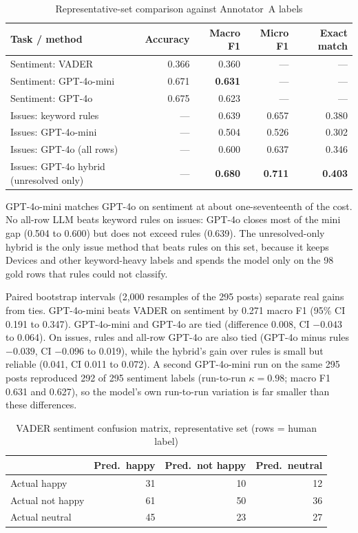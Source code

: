 \documentclass[11pt,a4paper]{article}
\begin{document}
\begin{table}[H]
\centering
\caption{Representative-set comparison against Annotator~A labels}
\label{tab:headlinemetrics}
\begin{tabular}{lrrrr}
\toprule
\textbf{Task / method} & \textbf{Accuracy} & \textbf{Macro F1} & \textbf{Micro F1} & \textbf{Exact match} \\
\midrule
Sentiment: VADER & 0.366 & 0.360 & --- & --- \\
Sentiment: GPT-4o-mini & 0.671 & \textbf{0.631} & --- & --- \\
Sentiment: GPT-4o & 0.675 & 0.623 & --- & --- \\
Issues: keyword rules & --- & 0.639 & 0.657 & 0.380 \\
Issues: GPT-4o-mini & --- & 0.504 & 0.526 & 0.302 \\
Issues: GPT-4o (all rows) & --- & 0.600 & 0.637 & 0.346 \\
Issues: GPT-4o hybrid (unresolved only) & --- & \textbf{0.680} & \textbf{0.711} & \textbf{0.403} \\
\bottomrule
\end{tabular}
\end{table}

GPT-4o-mini matches GPT-4o on sentiment at about one-seventeenth of the cost. No all-row LLM beats keyword rules on issues: GPT-4o closes most of the mini gap (0.504 to 0.600) but does not exceed rules (0.639). The unresolved-only hybrid is the only issue method that beats rules on this set, because it keeps Devices and other keyword-heavy labels and spends the model only on the 98 gold rows that rules could not classify.

Paired bootstrap intervals (2,000 resamples of the 295 posts) separate real gains from ties. GPT-4o-mini beats VADER on sentiment by 0.271 macro F1 (95\% CI 0.191 to 0.347). GPT-4o-mini and GPT-4o are tied (difference 0.008, CI $-0.043$ to 0.064). On issues, rules and all-row GPT-4o are also tied (GPT-4o minus rules $-0.039$, CI $-0.096$ to 0.019), while the hybrid's gain over rules is small but reliable (0.041, CI 0.011 to 0.072). A second GPT-4o-mini run on the same 295 posts reproduced 292 of 295 sentiment labels (run-to-run $\kappa=0.98$; macro F1 0.631 and 0.627), so the model's own run-to-run variation is far smaller than these differences.

\begin{table}[H]
\centering
\caption{VADER sentiment confusion matrix, representative set (rows = human label)}
\label{tab:cmvader}
\begin{tabular}{lrrr}
\toprule
 & \textbf{Pred.\ happy} & \textbf{Pred.\ not happy} & \textbf{Pred.\ neutral} \\
\midrule
Actual happy & 31 & 10 & 12 \\
Actual not happy & 61 & 50 & 36 \\
Actual neutral & 45 & 23 & 27 \\
\bottomrule
\end{tabular}
\end{table}
\end{document}
